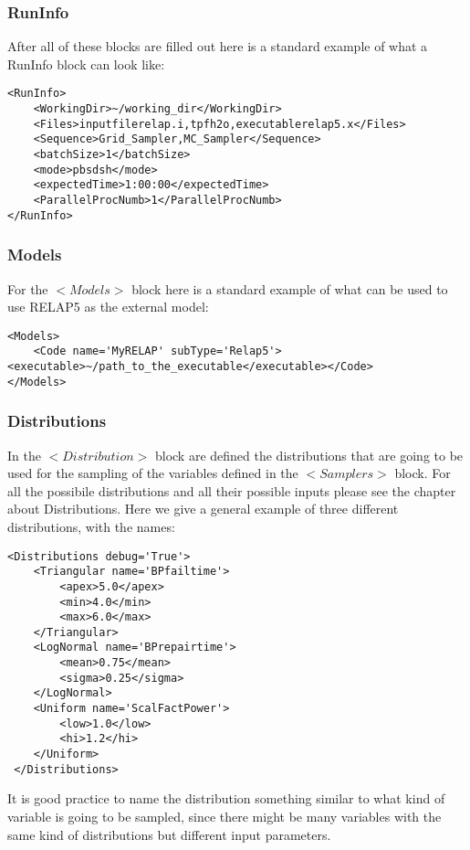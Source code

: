 \subsubsection{RunInfo}
After all of these blocks are filled out here is a standard example of what a RunInfo block can look like:
\begin{lstlisting}[style=XML]
<RunInfo>
    <WorkingDir>~/working_dir</WorkingDir>
    <Files>inputfilerelap.i,tpfh2o,executablerelap5.x</Files>
    <Sequence>Grid_Sampler,MC_Sampler</Sequence>
    <batchSize>1</batchSize>
	<mode>pbsdsh</mode>
    <expectedTime>1:00:00</expectedTime>
    <ParallelProcNumb>1</ParallelProcNumb>
</RunInfo>
\end{lstlisting}
\subsubsection{Models}
For the $<Models>$ block here is a standard example of what can be used to use RELAP5 as the external model:
\begin{lstlisting}[style=XML]
<Models>
    <Code name='MyRELAP' subType='Relap5'><executable>~/path_to_the_executable</executable></Code>
</Models>
\end{lstlisting}
\subsubsection{Distributions}
In the $<Distribution>$ block are defined the distributions that are going to be used for the sampling of the variables defined in the $<Samplers>$ block. For all the possibile distributions and all their possible inputs please see the chapter about Distributions. Here we give a general example of three different distributions, with the names:
\begin{lstlisting}[style=XML]
<Distributions debug='True'>
    <Triangular name='BPfailtime'>
        <apex>5.0</apex>
        <min>4.0</min>
		<max>6.0</max>
    </Triangular>
    <LogNormal name='BPrepairtime'>
        <mean>0.75</mean>
        <sigma>0.25</sigma>
    </LogNormal>
	<Uniform name='ScalFactPower'>
        <low>1.0</low>
        <hi>1.2</hi>
    </Uniform>
 </Distributions>
\end{lstlisting}
It is good practice to name the distribution something similar to what kind of variable is going to be sampled, since there might be many variables with the same kind of distributions but different input parameters. 
